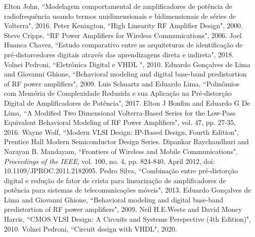 \documentclass[
	12pt,				%
	openright,			%
	oneside,			%
	a4paper,			%
	brazil				%
	]{abntex2}
\begin{document}
\begin{thebibliography}{}
	 Elton John, ``Modelagem comportamental de amplificadores de potência de radiofrequência usando termos unidimensionais e bidimensionais de séries de Volterra", 2016.
	 Peter Kenington, ``High Linearity RF Amplifier Design", 2000.
	 Steve Cripps, ``RF Power Amplifiers for Wireless Communications", 2006.
	 Joel Huanca Chavez, ``Estudo comparativo entre as arquiteturas de identificação de pré-distorcedores digitais através das aprendizagens direta e indireta", 2018.
	 Volnei Pedroni, ``Eletrônica Digital e VHDL ", 2010.
	 Eduardo Gonçalves de Lima and Giovanni Ghione, ``Behavioral modeling and digital base-band predistortion of RF power amplifiers", 2009.
	 Luis Schuartz and Eduardo Lima, ``Polinômios com Memória de Complexidade Reduzida e sua Aplicação na Pré-distorção Digital de Amplificadores de Potência", 2017.
	 Elton J Bonfim and Eduardo G De Lima, ``A Modified Two Dimensional Volterra-Based Series for the Low-Pass Equivalent Behavioral Modeling of RF Power Amplifiers", vol. 47, pp. 27-35, 2016.
	 Wayne Wolf, ``Modern VLSI Design: IP-Based Design, Fourth Edition", Prentice Hall Modern Semiconductor Design Series.
	 Dipankar Raychaudhuri and Narayan B. Mandayam, ``Frontiers of Wireless and Mobile Communications", \emph{Proceedings of the IEEE}, vol. 100, no. 4, pp. 824-840, April 2012, doi: 10.1109/JPROC.2011.2182095.
	 Pedro Silva, ``Combinação entre pré-distorção digital e redução de fator de crista para linearização de amplificadores de potência para sistemas de telecomunicações móveis", 2013.
	 Eduardo Gonçalves de Lima and Giovanni Ghione, ``Behavioral modeling and digital base-band predistortion of RF power amplifiers", 2009.
	 Neil H.E.Weste and David Money Harris, ``CMOS VLSI Design: A Circuits and Systems Perspective (4th Edition)", 2010.
	 Volnei Pedroni, ``Circuit design with VHDL", 2020.
\end{thebibliography}
\endgroup

%


\postextual
\end{document}
